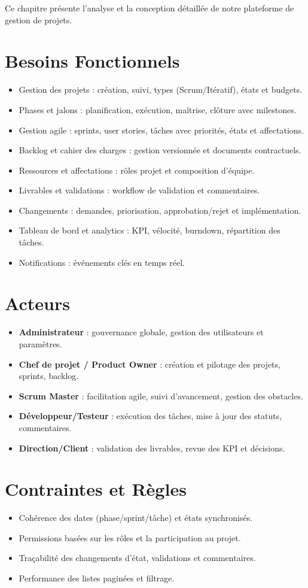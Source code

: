 Ce chapitre présente l'analyse et la conception détaillée de notre plateforme de gestion de projets.

\section{Besoins Fonctionnels}
\begin{itemize}
  \item Gestion des projets : création, suivi, types (Scrum/Itératif), états et budgets.
  \item Phases et jalons : planification, exécution, maîtrise, clôture avec milestones.
  \item Gestion agile : sprints, user stories, tâches avec priorités, états et affectations.
  \item Backlog et cahier des charges : gestion versionnée et documents contractuels.
  \item Ressources et affectations : rôles projet et composition d'équipe.
  \item Livrables et validations : workflow de validation et commentaires.
  \item Changements : demandes, priorisation, approbation/rejet et implémentation.
  \item Tableau de bord et analytics : KPI, vélocité, burndown, répartition des tâches.
  \item Notifications : événements clés en temps réel.
\end{itemize}

\section{Acteurs}
\begin{itemize}
  \item \textbf{Administrateur} : gouvernance globale, gestion des utilisateurs et paramètres.
  \item \textbf{Chef de projet / Product Owner} : création et pilotage des projets, sprints, backlog.
  \item \textbf{Scrum Master} : facilitation agile, suivi d'avancement, gestion des obstacles.
  \item \textbf{Développeur/Testeur} : exécution des tâches, mise à jour des statuts, commentaires.
  \item \textbf{Direction/Client} : validation des livrables, revue des KPI et décisions.
\end{itemize}

\section{Contraintes et Règles}
\begin{itemize}
  \item Cohérence des dates (phase/sprint/tâche) et états synchronisés.
  \item Permissions basées sur les rôles et la participation au projet.
  \item Traçabilité des changements d'état, validations et commentaires.
  \item Performance des listes paginées et filtrage.
\end{itemize}

